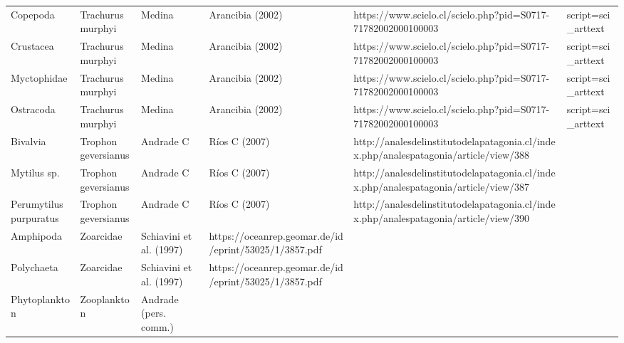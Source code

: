 \documentclass[
]{article}
\begin{document}
\begin{landscape}
\begin{longtable}[t]{>{\raggedright\arraybackslash}p{4cm}>{\centering\arraybackslash}p{4cm}>{\centering\arraybackslash}p{6cm}>{\centering\arraybackslash}p{6cm}}
\addlinespace
Copepoda & Trachurus murphyi & \tiny Medina & Arancibia (2002) & \tiny https://www.scielo.cl/scielo.php?pid=S0717-71782002000100003&script=sci_arttext\\
Crustacea & Trachurus murphyi & \tiny Medina & Arancibia (2002) & \tiny https://www.scielo.cl/scielo.php?pid=S0717-71782002000100003&script=sci_arttext\\
Myctophidae & Trachurus murphyi & \tiny Medina & Arancibia (2002) & \tiny https://www.scielo.cl/scielo.php?pid=S0717-71782002000100003&script=sci_arttext\\
Ostracoda & Trachurus murphyi & \tiny Medina & Arancibia (2002) & \tiny https://www.scielo.cl/scielo.php?pid=S0717-71782002000100003&script=sci_arttext\\
Bivalvia & Trophon geversianus & \tiny Andrade C & Ríos C (2007) & \tiny http://analesdelinstitutodelapatagonia.cl/index.php/analespatagonia/article/view/388\\
\addlinespace
Mytilus sp. & Trophon geversianus & \tiny Andrade C & Ríos C (2007) & \tiny http://analesdelinstitutodelapatagonia.cl/index.php/analespatagonia/article/view/387\\
Perumytilus purpuratus & Trophon geversianus & \tiny Andrade C & Ríos C (2007) & \tiny http://analesdelinstitutodelapatagonia.cl/index.php/analespatagonia/article/view/390\\
Amphipoda & Zoarcidae & \tiny Schiavini et al. (1997) & \tiny https://oceanrep.geomar.de/id/eprint/53025/1/3857.pdf\\
Polychaeta & Zoarcidae & \tiny Schiavini et al. (1997) & \tiny https://oceanrep.geomar.de/id/eprint/53025/1/3857.pdf\\
Phytoplankton & Zooplankton & \tiny Andrade (pers. comm.) & \tiny\\
\bottomrule
\end{longtable}

\newpage


\end{landscape}
\end{document}
